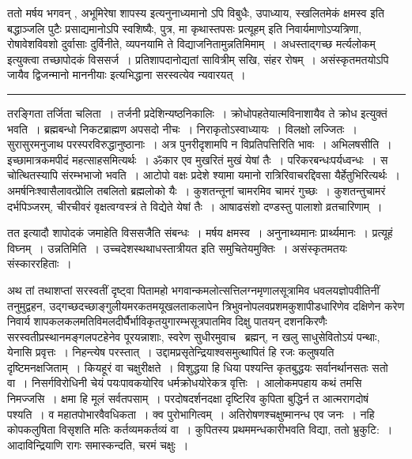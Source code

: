 \documentclass[11pt, openany]{book}
\begin{document}
ततो {\haq मर्षय भगवन् , अभूमिरेषा शापस्य} इत्यनुनाध्यमानो ऽपि विबुधैः, {\haq उपाध्याय, स्खलितमेकं क्षमस्व} इति बद्धाञ्जलि पुटैः प्रसाद्यमानोऽपि स्वशिष्यैः, {\haq पुत्र, मा कृथास्तपसः प्रत्यूहम्} इति निवार्यमाणोऽप्यत्रिणा, रोषावेशविवशो दुर्वासाः {\haq दुर्विनीते, व्यपनयामि ते विद्याजनितामुन्नतिमिमाम्~। अधस्ताद्गच्छ मर्त्यलोकम्} इत्युक्त्वा तच्छापोदकं विससर्ज~। प्रतिशापदानोद्यतां सावित्रीम् {\haq सखि, संहर रोषम्~। असंस्कृतमतयोऽपि जायैव द्विजन्मानो माननीयाः} इत्यभिद्धाना सरस्वत्येव न्यवारयत्~।

\vspace{2mm}
\hrule

\noindent
{\s तरङ्गिता तर्जिता चलिता~। तर्जनी प्रदेशिन्यष्ठनिकालिः~। क्रोधोपहतेयात्मविनाशायैव ते क्रोध इत्युक्तं भवति~। ब्रह्मबन्धो निकटब्राह्मण अपसदो नीचः~। निराकृतोऽस्वाध्यायः~। विलक्षो लज्जितः~। सुरासुरमनुजाथ परस्परविरुद्धानुष्ठानाः~। अत्र पुनरीदृशामपि न विप्रतिपत्तिरिति भावः~। {\qtt अभिलषसीति}~। इच्छामात्रकमपीदं महत्साहसमित्यर्थः~। ॐकार एव मुखरितं मुखं येषां तैः~। परिकरबन्धःपर्यध्वन्धः~। स चोत्थितस्यापि संरम्भभाजो भवति~। आटोपो वक्षः प्रदेशे श्यामा यमानो रात्रिरिवाचरद्दिवसा यैर्हेतुभिरित्यर्थः~। अमर्षनिःश्वासैलावत्प्रेोलि तबलितो ब्रह्मलोको यैः~। कुशतन्तूनां चामरमिव चामरं गुच्छः~। कुशतन्तुचामरं दर्भपिञ्जरम्, चीरचीवरं वृक्षत्वग्वस्त्रं ते विद्येते येषां तैः~। {\qt आषाढसंशो दण्डस्तु पालाशो व्रतचारिणाम्}~।

तत इत्यादौ शापोदकं जमाहेति विससजैति संबन्धः~। मर्षय क्षमस्व~। अनुनाथ्यमानः प्रार्थ्यमानः~। प्रत्यूहं विघ्नम्~। {\qtt उन्नतिमिति}~। उच्चदेशस्थथाधस्तात्रीयत इति समुचितेयमुक्तिः~। असंस्कृतमतयः संस्काररहिताः~।}

\newpage

अथ तां तथाशप्तां सरस्वतीं दृष्ट्वा पितामहो भगवान्कमलोत्सत्तिलग्नमृणालसूत्रामिव धवलयज्ञोपवीतिनीं तनुमुद्वहन, उद्गच्छदच्छाङ्गुलीयमरकतमयूखलताकलापेन त्रिभुवनोपलवप्रशमकुशापीडधारिणेव दक्षिणेन करेण निवार्य शापकलकलमतिविमलदीर्घैर्भाविकृतयुगारम्भसूत्रपातमिव दिक्षु पातयन् दशनकिरणैः सरस्वतीप्रस्थानमङ्गलपटहेनेव पूरयन्नाशाः, स्वरेण सुधीरमुवाच \textendash\ ब्रह्मन्, न खलु साधुसेवितोऽयं पन्थाः, येनासि प्रवृत्तः~। निहन्त्येष परस्तात्~। उद्दामप्रसृतेन्द्रियाश्वसमुत्थापितं हि रजः कलुषयति दृष्टिमनक्षजिताम्~। कियहूरं वा चक्षुरीक्षते~। विशुद्धया हि धिया पश्यन्ति कृतबुद्धयः सर्वानर्थानसतः सतो वा~। निसर्गविरोधिनी चेयं पयःपावकयोरिव धर्मक्रोधयोरेकत्र वृत्तिः~। आलोकमपहाय कथं तमसि निमज्जसि~। क्षमा हि मूलं सर्वतपसाम्~। परदोषदर्शनदक्षा दृष्टिरिव कुपिता बुद्धिर्न त आत्मरागदोषं पश्यति~। व महातपोभारवैवधिकता~। क्व पुरोभागित्वम्~। अतिरोषणश्चक्षुष्मानन्ध एव जनः~। नहि कोपकलुषिता विसृशति मतिः कर्तव्यमकर्तव्यं वा~। कुपितस्य प्रथममन्धकारीभवति विद्या, ततो भ्रुकुटि:~। आदाविन्द्रियाणि रागः समास्कन्दति, चरमं चक्षुः~।
\end{document}
